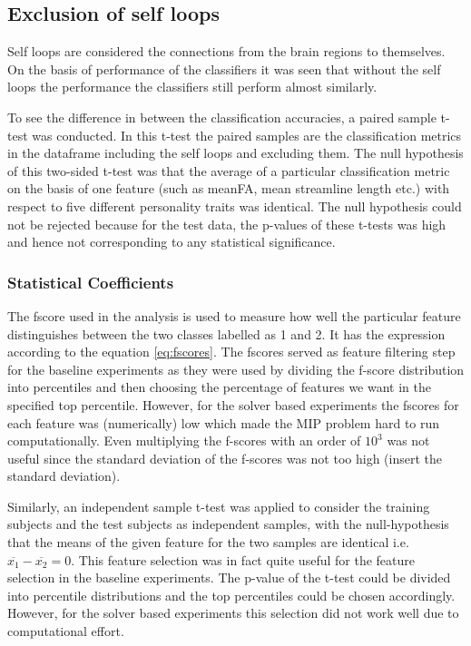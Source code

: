 \documentclass[msthesis.tex]{subfiles}
\begin{document}
\subsection{Exclusion of self loops}
Self loops are considered the connections from the brain regions to themselves. On the basis of performance of the classifiers it was seen that without the self loops the performance the classifiers still perform almost similarly.

To see the difference in between the classification accuracies, a paired sample t-test was conducted. In this t-test the paired samples are the classification metrics in the dataframe including the self loops and excluding them. The null hypothesis of this two-sided t-test was that the average of a particular classification metric on the basis of one feature (such as meanFA, mean streamline length etc.) with respect to five different personality traits was identical. The null hypothesis could not be rejected because for the test data, the p-values of these t-tests was high and hence not corresponding to any statistical significance. 

\subsubsection{Statistical Coefficients}

The fscore used in the analysis is used to measure how well the particular feature distinguishes between the two classes labelled as 1 and 2. It has the expression according to the equation \ref{eq:fscores}. The fscores served as feature filtering step for the baseline experiments as they were used by dividing the f-score distribution into percentiles and then choosing the percentage of features we want in the specified top percentile. However, for the solver based experiments the fscores for each feature was (numerically) low which made the MIP problem hard to run computationally. Even multiplying the f-scores with an order of $10^3$ was not useful since the standard deviation of the f-scores was not too high (insert the standard deviation). 

Similarly, an independent sample t-test was applied to consider the training subjects and the test subjects as independent samples, with the null-hypothesis that the means of the given feature for the two samples are identical i.e. $\overline{x_{1}} - \overline{x_{2}} = 0$. This feature selection was in fact quite useful for the feature selection in the baseline experiments. The p-value of the t-test could be divided into percentile distributions and the top percentiles could be chosen accordingly. However, for the solver based experiments this selection did not work well due to computational effort. 
\end{document}
